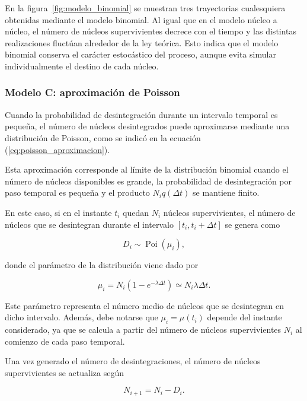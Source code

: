 \documentclass[12pt,a4paper]{article}
\begin{document}
En la figura~\ref{fig:modelo_binomial} se muestran tres trayectorias cualesquiera obtenidas mediante el modelo binomial. Al igual que en el modelo núcleo a núcleo, el número de núcleos supervivientes decrece con el tiempo y las distintas realizaciones fluctúan alrededor de la ley teórica. Esto indica que el modelo binomial conserva el carácter estocástico del proceso, aunque evita simular individualmente el destino de cada núcleo.

\subsubsection{Modelo C: aproximación de Poisson}

Cuando la probabilidad de desintegración durante un intervalo temporal es pequeña, el número de núcleos desintegrados puede aproximarse mediante una distribución de Poisson, como se indicó en la ecuación (\ref{eq:poisson_aproximacion}).

Esta aproximación corresponde al límite de la distribución binomial cuando el número de núcleos disponibles es grande, la probabilidad de desintegración por paso temporal es pequeña y el producto $N_iq(\Delta t)$ se mantiene finito.

En este caso, si en el instante $t_i$ quedan $N_i$ núcleos supervivientes, el número de núcleos que se desintegran durante el intervalo $[t_i,t_i+\Delta t]$ se genera como

\begin{equation}
    D_i\sim\operatorname{Poi}(\mu_i),
\end{equation}

donde el parámetro de la distribución viene dado por

\begin{equation}
    \mu_i = N_i\left(1-e^{-\lambda \Delta t}\right)
    \simeq N_i\lambda \Delta t.
\end{equation}

Este parámetro representa el número medio de núcleos que se desintegran en dicho intervalo. Además, debe notarse que $\mu_i=\mu(t_i)$ depende del instante considerado, ya que se calcula a partir del número de núcleos supervivientes $N_i$ al comienzo de cada paso temporal.

Una vez generado el número de desintegraciones, el número de núcleos supervivientes se actualiza según

\begin{equation}
    N_{i+1}=N_i-D_i.
\end{equation}
\end{document}
